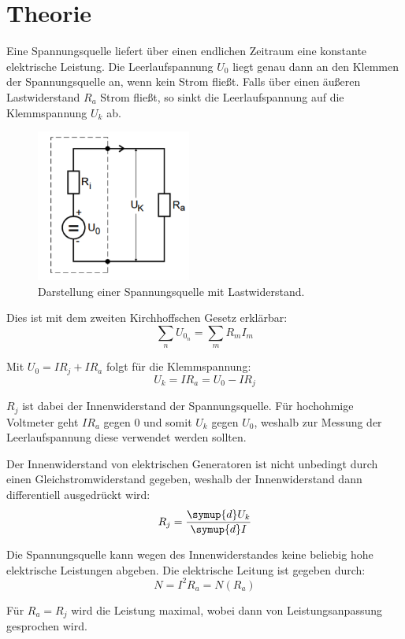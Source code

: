 \section{Theorie}
\label{sec:Theorie}
Eine Spannungsquelle liefert über einen endlichen Zeitraum eine konstante elektrische Leistung.
Die Leerlaufspannung $U_0$ liegt genau dann an den Klemmen der Spannungsquelle an, wenn kein Strom fließt.
Falls über einen äußeren Lastwiderstand $R_a$ Strom fließt, so sinkt die Leerlaufspannung auf
die Klemmspannung $U_k$ ab.

\begin{figure}[H]
  \centering
  \includegraphics[height=5cm]{bild1.PNG}
  \caption{Darstellung einer Spannungsquelle mit Lastwiderstand. \cite{sample}}
  \label{fig:RLC-Kreis(mit Widerstand)}
\end{figure}


Dies ist mit dem zweiten Kirchhoffschen Gesetz erklärbar:
\begin{equation}
  \sum_{n} U_{0_n} = \sum_{m} R_m I_m
\end{equation}

Mit $U_0 = IR_j + IR_a$ folgt für die Klemmspannung:
\begin{equation}
  U_k = IR_a = U_0 - IR_j
\end{equation}

$R_j$ ist dabei der Innenwiderstand der Spannungsquelle.
Für hochohmige Voltmeter geht $IR_a$ gegen $0$ und somit $U_k$ gegen $U_0$, weshalb zur Messung der Leerlaufspannung
diese verwendet werden sollten.

Der Innenwiderstand von elektrischen Generatoren ist nicht unbedingt durch einen Gleichstromwiderstand gegeben, weshalb
der Innenwiderstand dann differentiell ausgedrückt wird:
\begin{equation}
  R_j = \frac{\symup{d}U_k}{\symup{d}I}
\end{equation}

Die Spannungsquelle kann wegen des Innenwiderstandes keine beliebig hohe elektrische Leistungen
abgeben. Die elektrische Leitung ist gegeben durch:
\begin{equation}
  N = I^2 R_a = N(R_a)
\end{equation}

Für $R_a = R_j$ wird die Leistung maximal, wobei dann von Leistungsanpassung gesprochen wird.
